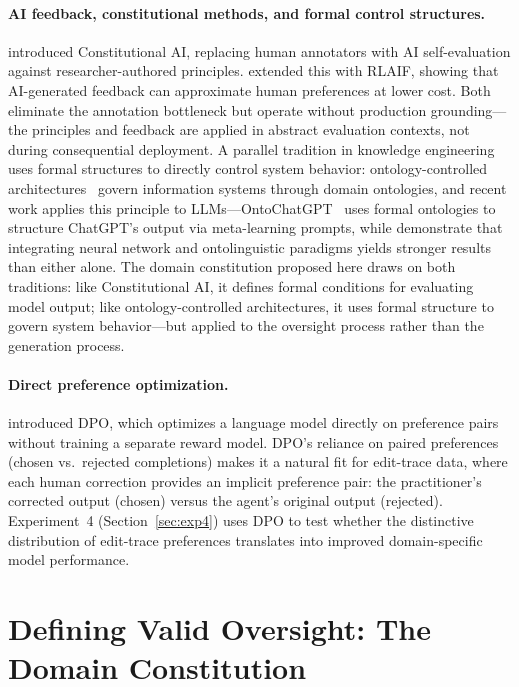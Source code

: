 \documentclass[11pt]{article}
\begin{document}
\paragraph{AI feedback, constitutional methods, and formal control structures.}
\citet{bai2022constitutional} introduced Constitutional AI, replacing human annotators with AI self-evaluation against researcher-authored principles.
\citet{lee2023rlaif} extended this with RLAIF, showing that AI-generated feedback can approximate human preferences at lower cost.
Both eliminate the annotation bottleneck but operate without production grounding---the principles and feedback are applied in abstract evaluation contexts, not during consequential deployment.
A parallel tradition in knowledge engineering uses formal structures to directly control system behavior: ontology-controlled architectures~\citep{palagin2006architecture} govern information systems through domain ontologies, and recent work applies this principle to LLMs---OntoChatGPT~\citep{palagin2023ontochatgpt} uses formal ontologies to structure ChatGPT's output via meta-learning prompts, while \citet{palagin2024neural} demonstrate that integrating neural network and ontolinguistic paradigms yields stronger results than either alone.
The domain constitution proposed here draws on both traditions: like Constitutional AI, it defines formal conditions for evaluating model output; like ontology-controlled architectures, it uses formal structure to govern system behavior---but applied to the oversight process rather than the generation process.

\paragraph{Direct preference optimization.}
\citet{rafailov2023direct} introduced DPO, which optimizes a language model directly on preference pairs without training a separate reward model.
DPO's reliance on paired preferences (chosen vs.\ rejected completions) makes it a natural fit for edit-trace data, where each human correction provides an implicit preference pair: the practitioner's corrected output (chosen) versus the agent's original output (rejected).
Experiment~4 (Section~\ref{sec:exp4}) uses DPO to test whether the distinctive distribution of edit-trace preferences translates into improved domain-specific model performance.


\section{Defining Valid Oversight: The Domain Constitution}
\label{sec:domain-constitution}
\end{document}
